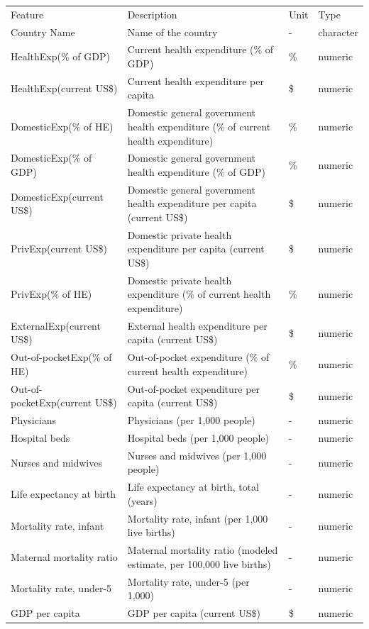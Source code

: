 \documentclass[11pt, a4paper]{article}
\begin{document}
\begin{table}[ht]
\begin{tabularx}{\textwidth}{lXl l}
\rowcolor[HTML]{000000} 
{\color[HTML]{FFFFFF} Feature} & {\color[HTML]{FFFFFF} Description} & {\color[HTML]{FFFFFF} Unit} & {\color[HTML]{FFFFFF} Type} \\
Country Name & Name of the country & - & character \\
HealthExp(\% of GDP) & Current health expenditure (\% of GDP) & \% & numeric \\
HealthExp(current US\$) & Current health expenditure per capita & \$ & numeric \\
DomesticExp(\% of HE) & Domestic general government health expenditure (\% of current health expenditure) & \% & numeric \\
DomesticExp(\% of GDP) & Domestic general government health expenditure (\% of GDP) & \% & numeric \\
DomesticExp(current US\$) & Domestic general government health expenditure per capita (current US\$) & \$ & numeric \\
PrivExp(current US\$) & Domestic private health expenditure per capita (current US\$) & \$ & numeric \\
PrivExp(\% of HE) & Domestic private health expenditure (\% of current health expenditure) & \% & numeric \\
ExternalExp(current US\$) & External health expenditure per capita (current US\$) & \$ & numeric \\
Out-of-pocketExp(\% of HE) & Out-of-pocket expenditure (\% of current health expenditure) & \% & numeric \\
Out-of-pocketExp(current US\$) & Out-of-pocket expenditure per capita (current US\$) & \$ & numeric \\
Physicians & Physicians (per 1,000 people) & - & numeric \\
Hospital beds & Hospital beds (per 1,000 people) & - & numeric \\
Nurses and midwives & Nurses and midwives (per 1,000 people) & - & numeric \\
Life expectancy at birth & Life expectancy at birth, total (years) & - & numeric \\
Mortality rate, infant & Mortality rate, infant (per 1,000 live births) & - & numeric \\
Maternal mortality ratio & Maternal mortality ratio (modeled estimate, per 100,000 live births) & - & numeric \\
Mortality rate, under-5 & Mortality rate, under-5 (per 1,000) & - & numeric \\
GDP per capita & GDP per capita (current US\$) & \$ & numeric
\end{tabularx}
\end{table}
\end{document}
